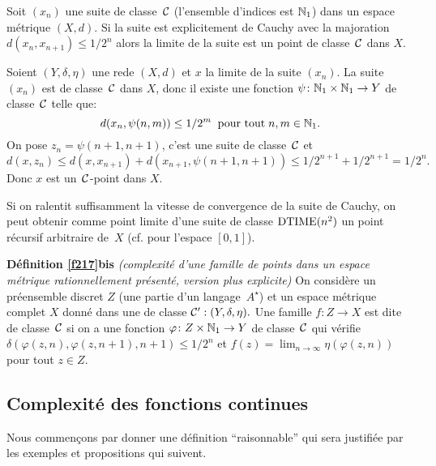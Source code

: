 \begin{fproposition} \label{f219}
Soit  $(x_n)$  une suite de classe~${{\cal C}}$   (l'ensemble d'indices est  $\mathbb {N}_1$) 
dans un espace métrique \rapr  $(X,d)$.  Si la suite est explicitement de 
Cauchy avec la majoration   $d(x_n, x_{n+1}) \leq 1/2^n$  alors la limite de la 
suite est un point de classe~${{\cal C}}$   dans $X$.
\end{fproposition}
\proof Soient  $(Y, \delta, \eta)$  une re\rp  de  $(X,d)$  et  $x$  la limite de la suite  $(x_n)$.
La suite  $(x_n)$  est de classe~${{\cal C}}$   dans  $X$, donc il existe une fonction  $\psi \colon  \mathbb {N}_1 \times \mathbb {N}_1 \rightarrow Y$  de classe~${{\cal C}}$  telle que: 
$$d(x_n,\psi(n,m)) \leq 1/2^m \; \;\hbox{pour tout}\; n, m \in \mathbb {N}_1.
$$
On pose   $z_n = \psi(n+1,n+1)$, c'est une suite de classe~${{\cal C}}$    et
$$d(x,z_n) \leq d(x,x_{n+1}) + d(x_{n+1},\psi(n+1,n+1)) \leq 1/2^{n+1} +
1/2^{n+1} = 1/2^n.
$$
Donc  $x$  est un~${{\cal C}}$-point dans  $X$.
\eop

\begin{fremark}\label{f2110}
Si on ralentit suffisamment la vitesse de convergence de la suite de Cauchy, on 
peut obtenir comme point limite d'une suite de classe  ${\rm DTIME} (n^2)$  un point 
récursif arbitraire de~$X$  (cf. \cite{fKF82} pour l'espace  $[0,1]$).
\end{fremark} 
\mni
{\bf Définition \ref{f217}bis  }
{\em (complexité d'une famille de points dans un espace métrique 
rationnellement présenté, version plus explicite)} 
On considère un préensemble discret  $Z$  (une partie d'un 
langage~$A^{\star}$)  et un espace métrique complet  $X$  donné dans  une \pres de classe ${{\cal C}}': (Y,\delta,\eta).$  
Une famille $ f \colon  Z \rightarrow X$ est dite  de classe~${{\cal C}}$    si on a une fonction  
$ \varphi \colon  Z \times \mathbb {N}_1 \rightarrow Y$ de classe~${{\cal C}}$   qui vérifie $\delta(\varphi(z,n),\varphi(z,n+1),n+1) \leq 1/2^n  $
et $f(z)=\lim_{n\rightarrow \infty}\eta(\varphi(z,n))$ pour tout $z\in Z$.

\subsection{Complexité des fonctions \uni continues} \label{fsubsec22}

Nous commençons par donner une définition ``raisonnable'' qui sera 
justifiée par les exemples et propositions qui suivent.

